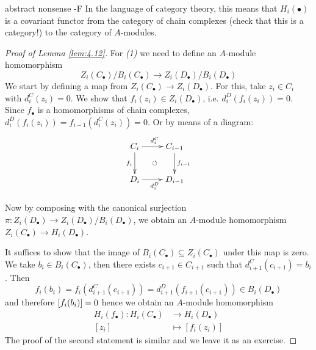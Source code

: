 \documentclass[twoside = false,	%
		headsepline,		%
		parskip = true,
		]{scrbook}						%
\begin{document}
        \begin{remark*}{abstract nonsense -F}
            In the language of category theory, this means that $H_i(\bullet)$ is a covariant functor from the category of chain complexes (check that this is a category!) to the category of $A$-modules.
        \end{remark*}

        \begin{proof}[Proof of Lemma \ref{lem:4.12}]
            For \textit{(1)} we need to define an $A$-module homomorphism
            \begin{equation*}
                Z_i(C_\bullet)/B_i(C_\bullet) \to Z_i(D_\bullet)/B_i(D_\bullet)
            \end{equation*}
            We start by defining a map from $Z_i(C_\bullet) \to Z_i(D_\bullet)$. For this, take $z_i \in C_i$ with $d_i^C(z_i) = 0$. We show that $f_i(z_i) \in Z_i(D_\bullet)$, i.e. $d_i^D(f_i(z_i)) = 0$. Since $f_\bullet$ is a homomorphisms of chain complexes, $d_i^D(f_i(z_i)) = f_{i-1}(d_i^C(z_i)) = 0$. Or by means of a diagram:
            \begin{equation*}
            \xymatrix {
                C_i \ar[r]^{d_i^C} \ar[d]_{f_i} & C_{i-1} \ar[d]^{f_{i-1}}\\
                D_i \ar[r]_{d_{i}^D} \ar@{}[ur]|{\circlearrowleft} & D_{i-1}
            }
            \end{equation*}

            Now by composing with the canonical surjection $\pi: Z_i(D_\bullet) \to Z_i(D_\bullet)/B_i(D_\bullet)$, we obtain an $A$-module homomorphism $Z_i(C_\bullet) \to H_i(D_\bullet)$.

            It suffices to show that the image of $B_i(C_\bullet) \subseteq Z_i(C_\bullet)$ under this map is zero. We take $b_i \in B_i(C_\bullet)$, then there exists $c_{i+1} \in C_{i+1}$ such that $d_{i+1}^C(c_{i+1}) = b_i$. Then
            \begin{equation*}
                f_i(b_i) = f_i(d_{i+1}^C(c_{i+1})) = d_{i+1}^D(f_{i+1}(c_{i+1})) \in B_i(D_\bullet)
            \end{equation*} and therefore $\left[ f_i(b_i)\right] = 0$ hence we obtain an $A$-module homomorphism
            \begin{equation*}
            \begin{split}
                H_i(f_\bullet): H_i(C_\bullet) &\to H_i(D_\bullet) \\ [z_i] &\mapsto [f_i(z_i)] 
            \end{split}
            \end{equation*}
            The proof of the second statement is similar and we leave it as an exercise. 
        \end{proof}
\end{document}
